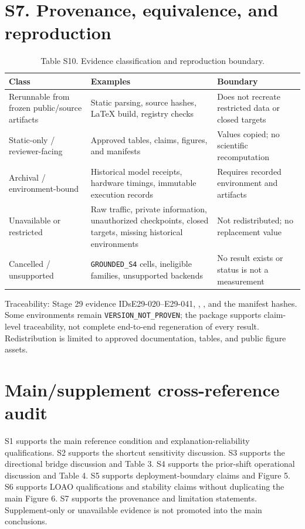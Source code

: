 \documentclass[preprint,12pt]{elsarticle}
\begin{document}
\section*{S7. Provenance, equivalence, and reproduction}
\begin{table}[htbp]
\centering\scriptsize
\caption{Table S10. Evidence classification and reproduction boundary.}
\begin{tabularx}{\textwidth}{@{}lXX@{}}
\toprule
Class & Examples & Boundary\\
\midrule
Rerunnable from frozen public/source artifacts & Static parsing, source hashes, LaTeX build, registry checks & Does not recreate restricted data or closed targets\\
Static-only / reviewer-facing & Approved tables, claims, figures, and manifests & Values copied; no scientific recomputation\\
Archival / environment-bound & Historical model receipts, hardware timings, immutable execution records & Requires recorded environment and artifacts\\
Unavailable or restricted & Raw traffic, private information, unauthorized checkpoints, closed targets, missing historical environments & Not redistributed; no replacement value\\
Cancelled / unsupported & \texttt{GROUNDED\_S4} cells, ineligible families, unsupported backends & No result exists or status is not a measurement\\
\bottomrule
\end{tabularx}
\end{table}
Traceability: Stage 29 evidence IDs\linebreak E29-020--E29-041, , , and the manifest hashes. Some environments remain \texttt{VERSION\_NOT\_PROVEN}; the package supports claim-level traceability, not complete end-to-end regeneration of every result. Redistribution is limited to approved documentation, tables, and public figure assets.

\section*{Main/supplement cross-reference audit}
S1 supports the main reference condition and explanation-reliability qualifications. S2 supports the shortcut sensitivity discussion. S3 supports the directional bridge discussion and Table 3. S4 supports the prior-shift operational discussion and Table 4. S5 supports deployment-boundary claims and Figure 5. S6 supports LOAO qualifications and stability claims without duplicating the main Figure 6. S7 supports the provenance and limitation statements. Supplement-only or unavailable evidence is not promoted into the main conclusions.
\end{document}
